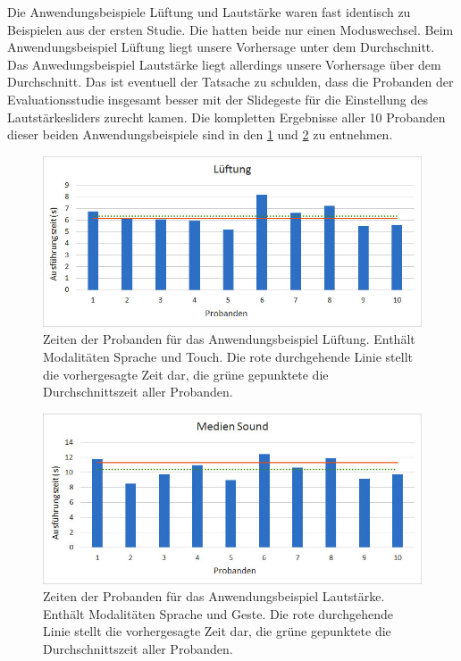 Die Anwendungsbeispiele Lüftung und Lautstärke waren fast identisch zu Beispielen aus der ersten Studie. Die hatten beide nur einen Moduswechsel. Beim Anwendungsbeispiel Lüftung liegt unsere Vorhersage unter dem Durchschnitt. Das Anwedungsbeispiel Lautstärke liegt allerdings unsere Vorhersage über dem Durchschnitt. 
Das ist eventuell der Tatsache zu schulden, dass die Probanden der Evaluationsstudie insgesamt besser mit der Slidegeste für die Einstellung des Lautstärkesliders zurecht kamen. 
Die kompletten Ergebnisse aller 10 Probanden dieser beiden Anwendungsbeispiele sind in den \ref{fig:Luft_Times} und \ref{fig:MedienS_Times} zu entnehmen. 
\begin{figure}
			\centering
			\includegraphics[width=1\textwidth]{img/Luft_Times.jpg}
			\caption[Zeiten der Probanden für das Anwendungsbeispiel Lüftung.]{Zeiten der Probanden für das Anwendungsbeispiel Lüftung. Enthält Modalitäten Sprache und Touch. Die rote durchgehende Linie stellt die vorhergesagte Zeit dar, die grüne gepunktete die Durchschnittszeit aller Probanden.}
			\label{fig:Luft_Times}
\end{figure}
\begin{figure}
			\centering
			\includegraphics[width=1\textwidth]{img/Medien_S_Times.jpg}
			\caption[Zeiten der Probanden für das Anwendungsbeispiel Lautstärke.]{Zeiten der Probanden für das Anwendungsbeispiel Lautstärke. Enthält Modalitäten Sprache und Geste. Die rote durchgehende Linie stellt die vorhergesagte Zeit dar, die grüne gepunktete die Durchschnittszeit aller Probanden.}
			\label{fig:MedienS_Times}		
\end{figure}

